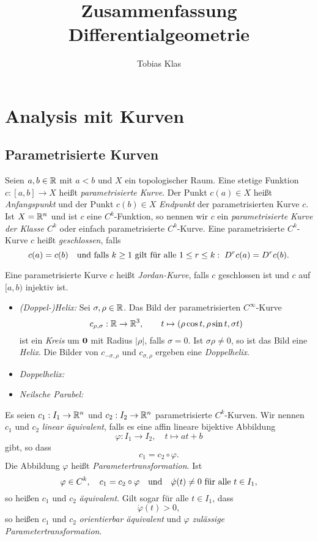 \documentclass[
pdftex,
oneside,
headsepline,
11pt, 
]{scrreprt}
\author{Tobias Klas}
\title{Zusammenfassung Differentialgeometrie}
\begin{document}
\maketitle	
\tableofcontents

\newpage	

\chapter{Analysis mit Kurven}
\section{Parametrisierte Kurven}
\begin{de}
	Seien $a,b\in \mathbb{R}$ mit $a<b$ und $X$ ein topologischer Raum. Eine stetige Funktion $c:[a,b]\to X$ heißt \textit{parametrisierte Kurve}. Der Punkt $c(a)\in X$ heißt \textit{Anfangspunkt} und der Punkt  $c(b)\in X$ \textit{Endpunkt} der parametrisierten Kurve $c$.
	Ist $X=\mathbb{R}^n$ und ist $c$ eine $C^k$-Funktion, so nennen wir $c$ ein \textit{parametrisierte Kurve der Klasse $C^k$} oder einfach parametrisierte $C^k$-Kurve.  Eine parametrisierte $C^k$-Kurve $c$ heißt \textit{geschlossen}, falls \[ c(a)=c(b) \quad \textnormal{und falls } k\geq 1 \textnormal{ gilt für alle } 1 \leq r\leq k:\; D^rc(a)=D^rc(b).\]
\end{de}
\begin{de} Eine parametrisierte Kurve $c$ heißt \textit{Jordan-Kurve}, falls $c$ geschlossen ist und $c$ auf $[a,b)$ injektiv ist. 
\end{de}
\begin{bsp}\quad
	\begin{itemize}
		\item \textit{(Doppel-)Helix:}
		Sei $\sigma, \rho\in\mathbb{R}$. Das Bild der parametrisierten $C^\infty$-Kurve \[ c_{\rho,\sigma}:\mathbb{R}\to \mathbb{R}^3,\qquad t\mapsto(\rho \cos t,\rho \sin t,\sigma t)\] ist ein \textit{Kreis} um $\textnormal{\textbf{0}}$ mit Radius $|\rho|$, falls $\sigma=0$. Ist $\sigma \rho\neq 0$, so ist das Bild eine \textit{Helix}. Die Bilder von $c_{-\sigma,\rho}$ und $c_{\sigma,\rho}$ ergeben eine \textit{Doppelhelix}.
		\item \textit{Doppelhelix:}
		\item \textit{Neilsche Parabel:}
	\end{itemize}
\end{bsp}
\begin{de}
	Es seien $c_1:I_1\to \mathbb{R}^n$ und $c_2:I_2\to\mathbb{R}^n$ parametrisierte $C^k$-Kurven. Wir nennen $c_1$ und $c_2$ \textit{linear äquivalent}, falls es eine affin lineare bijektive Abbildung \[\varphi:I_1\to I_2, \quad t\mapsto at+b\] gibt, so dass \[ c_1=c_2\circ\varphi. \] Die Abbildung $\varphi$ heißt \textit{Parametertransformation}. Ist \[\varphi\in C^k,\quad c_1=c_2\circ\varphi\quad \textnormal{und}\quad\dot{\varphi}(t)\neq0 \textnormal{ für alle }t\in I_1,\] so heißen $c_1$ und $c_2$ \textit{äquivalent}. Gilt sogar für alle $t\in I_1$, dass \[ \dot{\varphi}(t)>0,\] so heißen $c_1$ und $c_2$ \textit{orientierbar äquivalent} und $\varphi$ \textit{zulässige Parametertransformation}.  
\end{de}
\end{document}
